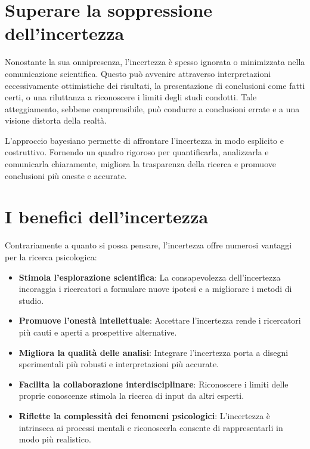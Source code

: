 \documentclass[
  letterpaper,
  DIV=11,
  numbers=noendperiod]{scrreprt}
\providecommand{\tightlist}{%
  \setlength{\itemsep}{0pt}\setlength{\parskip}{0pt}}\usepackage{longtable,booktabs,array}
\theoremstyle{definition}
\theoremstyle{remark}
\begin{document}
\section{Superare la soppressione
dell'incertezza}\label{superare-la-soppressione-dellincertezza}

Nonostante la sua onnipresenza, l'incertezza è spesso ignorata o
minimizzata nella comunicazione scientifica. Questo può avvenire
attraverso interpretazioni eccessivamente ottimistiche dei risultati, la
presentazione di conclusioni come fatti certi, o una riluttanza a
riconoscere i limiti degli studi condotti. Tale atteggiamento, sebbene
comprensibile, può condurre a conclusioni errate e a una visione
distorta della realtà.

L'approccio bayesiano permette di affrontare l'incertezza in modo
esplicito e costruttivo. Fornendo un quadro rigoroso per quantificarla,
analizzarla e comunicarla chiaramente, migliora la trasparenza della
ricerca e promuove conclusioni più oneste e accurate.

\section{I benefici dell'incertezza}\label{i-benefici-dellincertezza}

Contrariamente a quanto si possa pensare, l'incertezza offre numerosi
vantaggi per la ricerca psicologica:

\begin{itemize}
\tightlist
\item
  \textbf{Stimola l'esplorazione scientifica}: La consapevolezza
  dell'incertezza incoraggia i ricercatori a formulare nuove ipotesi e a
  migliorare i metodi di studio.
\item
  \textbf{Promuove l'onestà intellettuale}: Accettare l'incertezza rende
  i ricercatori più cauti e aperti a prospettive alternative.
\item
  \textbf{Migliora la qualità delle analisi}: Integrare l'incertezza
  porta a disegni sperimentali più robusti e interpretazioni più
  accurate.
\item
  \textbf{Facilita la collaborazione interdisciplinare}: Riconoscere i
  limiti delle proprie conoscenze stimola la ricerca di input da altri
  esperti.
\item
  \textbf{Riflette la complessità dei fenomeni psicologici}:
  L'incertezza è intrinseca ai processi mentali e riconoscerla consente
  di rappresentarli in modo più realistico.
\end{itemize}
\end{document}
